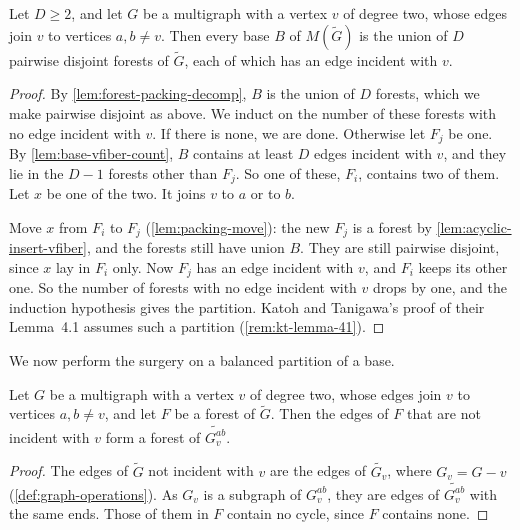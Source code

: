 \begin{lemma}
  \label{lem:balanced-forest-packing}
  \leanok
  Let $D \ge 2$, and let $G$ be a multigraph with a vertex $v$ of degree
  two, whose edges join $v$ to vertices $a, b \neq v$. Then every base
  $B$ of $M(\tilde G)$ is the union of $D$ pairwise disjoint forests of
  $\tilde G$, each of which has an edge incident with $v$.
\end{lemma}
\begin{proof}
  \leanok
  By \cref{lem:forest-packing-decomp}, $B$ is the union of $D$ forests,
  which we make pairwise disjoint as above. We induct on the number of
  these forests with no edge incident with $v$. If there is none, we are
  done. Otherwise let $F_j$ be one. By \cref{lem:base-vfiber-count}, $B$
  contains at least $D$ edges incident with $v$, and they lie in the
  $D - 1$ forests other than $F_j$. So one of these, $F_i$, contains two
  of them. Let $x$ be one of the two. It joins $v$ to $a$ or to $b$.

  Move $x$ from $F_i$ to $F_j$ (\cref{lem:packing-move}): the new $F_j$
  is a forest by \cref{lem:acyclic-insert-vfiber}, and the forests still
  have union $B$. They are still pairwise disjoint, since $x$ lay in
  $F_i$ only. Now $F_j$ has an edge incident with $v$, and $F_i$ keeps
  its other one. So the number of forests with no edge incident with $v$
  drops by one, and the induction hypothesis gives the partition. Katoh
  and Tanigawa's proof of their Lemma~4.1 assumes such a partition
  (\cref{rem:kt-lemma-41}).
\end{proof}

We now perform the surgery on a balanced partition of a base.

\begin{lemma}
  \label{lem:reroute-vfree-transport}
  \leanok
  Let $G$ be a multigraph with a vertex $v$ of degree two, whose edges
  join $v$ to vertices $a, b \neq v$, and let $F$ be a forest of
  $\tilde G$. Then the edges of $F$ that are not incident with $v$ form a
  forest of $\widetilde{G_v^{ab}}$.
\end{lemma}
\begin{proof}
  \leanok
  The edges of $\tilde G$ not incident with $v$ are the edges of
  $\widetilde{G_v}$, where $G_v = G - v$ (\cref{def:graph-operations}).
  As $G_v$ is a subgraph of $G_v^{ab}$, they are edges of
  $\widetilde{G_v^{ab}}$ with the same ends. Those of them in $F$
  contain no cycle, since $F$ contains none.
\end{proof}

